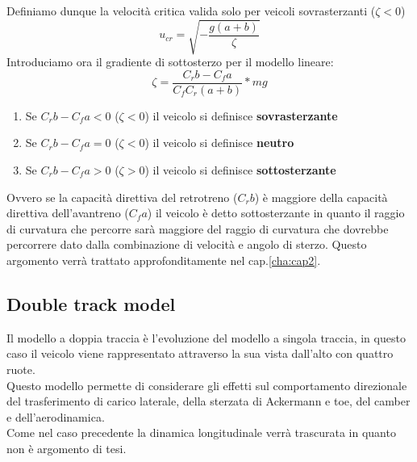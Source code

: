 Definiamo dunque la velocità critica valida solo per veicoli sovrasterzanti ($\zeta < 0$)
\begin{equation}
    u_{cr} = \sqrt{-\frac{g(a+b)}{\zeta}}
\end{equation}
Introduciamo ora il gradiente di sottosterzo per il modello lineare:
\begin{equation}
    \zeta = \frac{C_rb-C_fa}{C_f C_r (a+b)}*mg
\end{equation}
\begin{enumerate}
    \item Se $C_rb-C_fa < 0$ ($\zeta < 0$) il veicolo si definisce \textbf{sovrasterzante}
    \item Se $C_rb-C_fa = 0$ ($\zeta < 0$) il veicolo si definisce \textbf{neutro}
    \item Se $C_rb-C_fa > 0$ ($\zeta > 0$) il veicolo si definisce \textbf{sottosterzante}
\end{enumerate}
Ovvero se la capacità direttiva del retrotreno ($C_rb$) è maggiore della capacità direttiva dell'avantreno ($C_fa$) il
veicolo è detto sottosterzante in quanto il raggio di curvatura che percorre sarà maggiore del raggio di curvatura che 
dovrebbe percorrere dato dalla combinazione di velocità e angolo di sterzo. 
Questo argomento verrà trattato approfonditamente nel cap.\ref{cha:cap2}.

\subsection{Double track model}
Il modello a doppia traccia è l'evoluzione del modello a singola traccia, in questo caso il veicolo viene rappresentato attraverso la sua vista dall'alto con quattro ruote.\\
Questo modello permette di considerare gli effetti sul comportamento direzionale del trasferimento di carico laterale, della sterzata di Ackermann e toe, del camber e dell'aerodinamica.\\
Come nel caso precedente la dinamica longitudinale verrà trascurata in quanto non è argomento di tesi.\\

